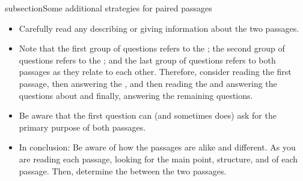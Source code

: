 subsection{Some additional strategies for paired passages}

\begin{itemize}

\item Carefully read any \longline describing or giving information about the two passages.

\item Note that the first group of questions refers to the \longline; the second group of questions refers to the \longline; and the last group of questions refers to both passages as they relate to each other. Therefore, consider reading the first passage, then answering the \longline, and then reading the \longline and answering the questions about \longline and finally, answering the remaining questions.

\item Be aware that the first question can (and sometimes does) ask for the primary purpose of both passages.

\item In conclusion: Be aware of how the passages are alike and different. As you are reading each passage, looking for the main point, structure, and \longline of each passage. Then, determine the \longline between the two passages. 
\end{itemize}